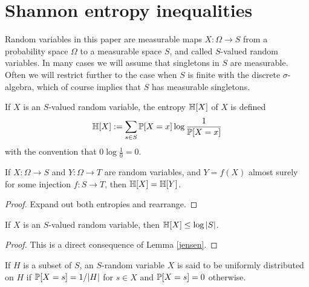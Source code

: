 \chapter{Shannon entropy inequalities}

Random variables in this paper are measurable maps $X : \Omega \to S$ from a probability space $\Omega$ to a measurable space $S$, and called $S$-valued random variables. In many cases we will assume that singletons in $S$ are measurable.  Often we will restrict further to the case when $S$ is finite with the discrete $\sigma$-algebra, which of course implies that $S$ has measurable singletons.

\begin{definition}[Entropy]
  \label{entropy-def}
  \leanok
  If $X$ is an $S$-valued random variable, the entropy $\mathbb{H}[X]$ of $X$ is defined
  $$ \mathbb{H}[X] := \sum_{s \in S} \mathbb{P}[X=x] \log \frac{1}{\mathbb{P}[X=x]}$$
  with the convention that $0 \log \frac{1}{0} = 0$.
\end{definition}

\begin{lemma}\label{relabeled-entropy} \leanok
  If $X: \Omega \to S$ and $Y: \Omega \to T$ are random variables, and $Y = f(X)$ almost surely for some injection $f: S \to T$, then $\mathbb{H}[X] = \mathbb{H}[Y]$.
\end{lemma}

\begin{proof} \leanok Expand out both entropies and rearrange.
\end{proof}

\begin{lemma}\label{jensen-bound}
  \leanok
  If $X$ is an $S$-valued random variable, then $\mathbb{H}[X] \leq \log |S|$.
\end{lemma}

\begin{proof}\leanok
  This is a direct consequence of Lemma \ref{jensen}.
\end{proof}

\begin{definition}\label{uniform-def}
   If $H$ is a subset of $S$, an $S$-random variable $X$ is said to be uniformly distributed on $H$ if $\mathbb{P}[X = s] = 1/|H|$ for $s \in X$ and $\mathbb{P}[X=s] = 0$ otherwise.
\end{definition}

